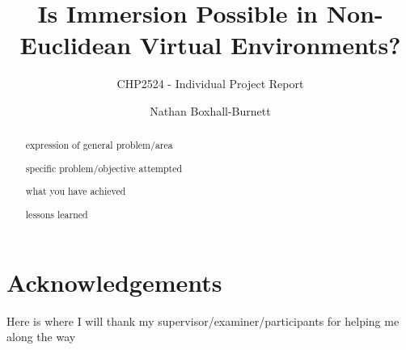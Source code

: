 \documentclass[abstract=on,12pt]{scrreprt}
\title{Is Immersion Possible in Non-Euclidean Virtual Environments?}
\subtitle{CHP2524 - Individual Project Report}
\author{Nathan Boxhall-Burnett}
\begin{document}
	\maketitle

	\renewcommand\thepage{}

	\begin{abstract}
		expression of general problem/area
		
		specific problem/objective attempted
		
		what you have achieved
		
		lessons learned
		
		

	\end{abstract}

	\section*{Acknowledgements}
		Here is where I will thank my supervisor/examiner/participants for helping me along the way

	\tableofcontents

	\newpage
	\renewcommand\thepage{\arabic{page}}

	
\end{document}
